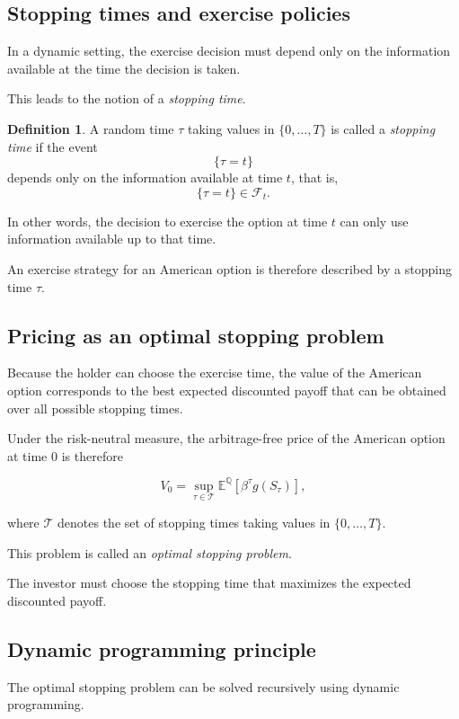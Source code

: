 \documentclass[11pt]{article}
\newcommand{\Qbb}{\mathbb{Q}}
\newcommand{\E}{\mathbb{E}}
\theoremstyle{definition}
\newtheorem{definition}{Definition}
\theoremstyle{plain}
\begin{document}
\subsection{Stopping times and exercise policies}

In a dynamic setting, the exercise decision must depend only on the
information available at the time the decision is taken.

This leads to the notion of a \emph{stopping time}.

\begin{definition}
A random time \(\tau\) taking values in \(\{0,\dots,T\}\) is called a
\emph{stopping time} if the event
\[
\{\tau = t\}
\]
depends only on the information available at time \(t\), that is,
\[
\{\tau=t\} \in \mathcal{F}_t.
\]
\end{definition}

In other words, the decision to exercise the option at time \(t\)
can only use information available up to that time.

An exercise strategy for an American option is therefore described by a
stopping time \(\tau\).

\subsection{Pricing as an optimal stopping problem}

Because the holder can choose the exercise time, the value of the
American option corresponds to the best expected discounted payoff
that can be obtained over all possible stopping times.

Under the risk-neutral measure, the arbitrage-free price of the
American option at time \(0\) is therefore

\[
V_0
=
\sup_{\tau \in \mathcal{T}}
\E^{\Qbb}
\left[
\beta^{\tau} g(S_\tau)
\right],
\]

where \(\mathcal{T}\) denotes the set of stopping times taking values in
\(\{0,\dots,T\}\).

This problem is called an \emph{optimal stopping problem}.

The investor must choose the stopping time that maximizes the expected
discounted payoff.

\subsection{Dynamic programming principle}

The optimal stopping problem can be solved recursively using dynamic
programming.
\end{document}
